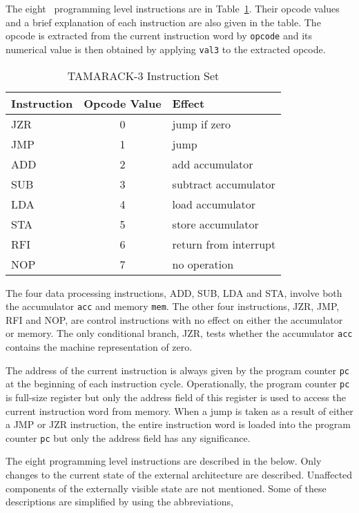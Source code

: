 The eight \Tamarack\ programming level instructions
are in Table~\ref{tab-inst}.
Their opcode values and a brief explanation of each instruction are
also given in the table.
The opcode is extracted from the current instruction word by
\verb"opcode" and its numerical value is then obtained
by applying \verb"val3" to the extracted opcode.

\begin{table}
\begin{center}
\begin{tabular}{|l|c|l|}
\hline
Instruction& Opcode Value& Effect\\ \hline\hline
JZR& 0& jump if zero\\ \hline
JMP& 1& jump\\ \hline
ADD& 2& add accumulator\\ \hline
SUB& 3& subtract accumulator\\ \hline
LDA& 4& load accumulator\\ \hline
STA& 5& store accumulator\\ \hline
RFI& 6& return from interrupt\\ \hline
NOP& 7& no operation \\ \hline
\end{tabular}
\caption{TAMARACK-3 Instruction Set}
\label{tab-inst}
\end{center}
\end{table}

The four data processing instructions,
ADD, SUB, LDA and STA,
involve both the
accumulator \verb"acc" and memory \verb"mem".
The other four instructions,
JZR, JMP, RFI and NOP, are control instructions
with no effect on either the accumulator or memory.
The only conditional branch, JZR, tests
whether the accumulator \verb"acc"
contains the machine representation of zero.

The address of the current instruction is always given by
the program counter \verb"pc" at the beginning of
each instruction cycle.
Operationally, the program counter \verb"pc" is full-size register
but only the address field of this register
is used to access the current instruction word from memory.
When a jump is taken as a result of either a JMP or JZR instruction,
the entire instruction word is loaded into the program counter \verb"pc"
but only the address field has any significance.

The eight programming level instructions are described
in the below.
Only changes to the current state of the external architecture
are described.
Unaffected components of the externally visible state are not mentioned.
Some of these descriptions are simplified by using
the abbreviations,

